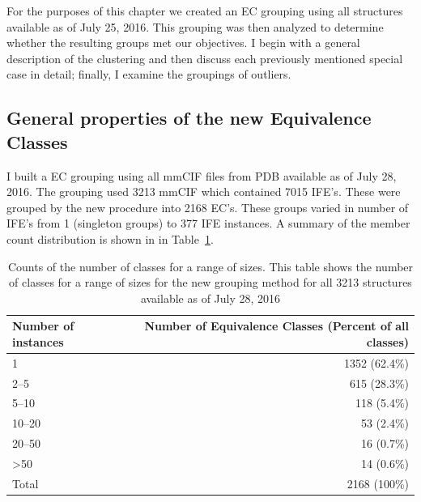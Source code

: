 For the purposes of this chapter we created an EC grouping using all structures
available as of July 25, 2016. This grouping was then analyzed to determine
whether the resulting groups met our objectives. I begin with a general
description of the clustering and then discuss each previously mentioned special
case in detail; finally, I examine the groupings of outliers.

\subsection{General properties of the new Equivalence Classes}

I built a EC grouping using all mmCIF files from PDB available as of July 28,
2016. The grouping used 3213 mmCIF which contained 7015 IFE's. These were
grouped by the new procedure into 2168 EC's. These groups varied in number
of IFE's from 1 (singleton groups) to 377 IFE instances. A summary of the
member count distribution is shown in in Table~\ref{tab:eq-size-dist}.

\begin{table}
  \begin{tabular}{lr}
    \toprule
    Number of instances & Number of Equivalence Classes (Percent of all classes) \\
    \midrule
    1               & 1352 (62.4\%) \\
    2--5             & 615 (28.3\%)  \\
    5--10            & 118 (5.4\%)   \\
    10--20           & 53 (2.4\%)    \\
    20--50           & 16 (0.7\%)    \\
    \textgreater 50 & 14 (0.6\%)    \\
    Total           & 2168 (100\%)  \\
    \bottomrule
  \end{tabular}
  \caption{Counts of the number of classes for a range of sizes. This table
    shows the number of classes for a range of sizes for the new grouping method
  for all 3213 structures available as of July 28, 2016}
\label{tab:eq-size-dist}
\end{table}

